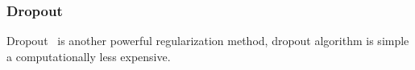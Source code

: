 \subsubsection{Dropout}

Dropout~\cite{JMLR:v15:srivastava14a} is another powerful regularization method, dropout algorithm is simple a  computationally less expensive. 